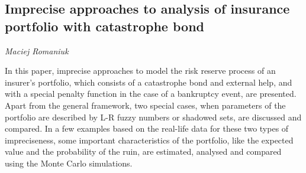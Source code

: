 \documentclass[../booklet.tex]{subfiles}
\begin{document}
\subsection[Imprecise approaches to analysis of insurance portfolio with catastrophe bond. {\it Maciej Romaniuk}]{Imprecise approaches to analysis of insurance portfolio with catastrophe bond}

\begin{center}
  {\it Maciej Romaniuk}
\end{center}

\vskip 0.8cm


In this paper, imprecise approaches to model the risk reserve process of an insurer's portfolio, which consists of a catastrophe bond and external help, and with a special penalty function in the case of a bankruptcy event, are presented.
Apart from the general framework, two special cases, when parameters of the portfolio are described by L-R fuzzy numbers or shadowed sets, are discussed and compared.
In a few examples based on the real-life data for these two types of impreciseness, some important characteristics of the portfolio, like the expected value and the probability of the ruin, are estimated, analysed and compared using the Monte Carlo simulations.  

\end{document}
